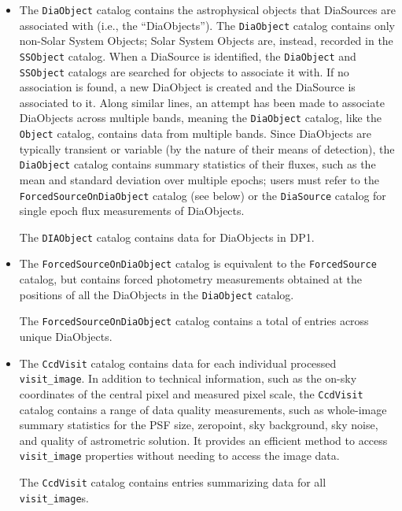 \begin{itemize}
\item The \texttt{DiaObject} catalog \citep{10.71929/rubin/2570319} contains the astrophysical objects that DiaSources are associated with (i.e., the ``DiaObjects'').
The \texttt{DiaObject} catalog contains only non-Solar System Objects; Solar System Objects are, instead, recorded in the \texttt{SSObject} catalog.
When a DiaSource is identified, the \texttt{DiaObject} and \texttt{SSObject} catalogs are searched for objects to associate it with.
If no association is found, a new DiaObject is created and the DiaSource is associated to it.
Along similar lines, an attempt has been made to associate DiaObjects across multiple bands, meaning the \texttt{DiaObject} catalog, like  the \texttt{Object} catalog, contains data from multiple bands.
Since DiaObjects are typically \gls{transient} or variable (by the nature of their means of detection), the \texttt{DiaObject} catalog contains summary statistics of their fluxes, such as the mean and standard deviation over multiple epochs; users must refer to the \texttt{ForcedSourceOnDiaObject} catalog (see below) or the \texttt{DiaSource} catalog for single \gls{epoch} \gls{flux} measurements of DiaObjects.

The \texttt{DIAObject} catalog contains data for \ndiaobjects DiaObjects in \gls{DP1}.

\item The \texttt{ForcedSourceOnDiaObject} catalog \citep{10.71929/rubin/2570321} is equivalent to the \texttt{ForcedSource} catalog, but contains \gls{forced photometry} measurements obtained at the positions of all the DiaObjects in the \texttt{DiaObject} catalog.

The \texttt{ForcedSourceOnDiaObject} catalog  contains a total of \ndiaforcedsources entries across \ndiaforcedobjects unique DiaObjects.

\item The \texttt{CcdVisit} catalog \citep{10.71929/rubin/2570331} contains data for each individual processed \texttt{visit\_image}.
In addition to technical information, such as the on-sky coordinates of the central pixel and measured pixel scale, the \texttt{CcdVisit} catalog contains a range of data quality measurements, such as whole-image summary statistics for the \gls{PSF} size, zeropoint, sky \gls{background}, sky noise, and quality of astrometric solution.
It provides an efficient method to access  \texttt{visit\_image} properties without needing to access the image data.

The \texttt{CcdVisit} catalog contains entries summarizing data for all \nvisitdetectorsummaries \texttt{visit\_image}s.


\end{itemize}
